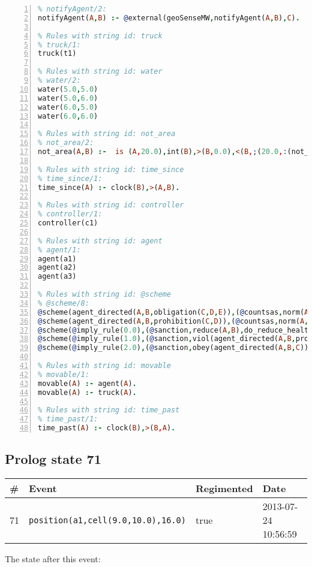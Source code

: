 \documentclass[11pt]{article}\usepackage[utf8]{inputenc}\usepackage{geometry}
\begin{document}
\begin{lstlisting}[language=Prolog, numbers=left]
% Rules with string id: notifyAgent
% notifyAgent/2:
notifyAgent(A,B) :- @external(geoSenseMW,notifyAgent(A,B),C).

% Rules with string id: truck
% truck/1:
truck(t1)

% Rules with string id: water
% water/2:
water(5.0,5.0)
water(5.0,6.0)
water(6.0,5.0)
water(6.0,6.0)

% Rules with string id: not_area
% not_area/2:
not_area(A,B) :-  is (A,20.0),int(B),>(B,0.0),<(B,;(20.0,:(not_area(A,B), is (-(B),20.0)))),int(A),>(A,0.0),<(A,;(20.0,:(area(A,B),-(int(A))))),int(B),>(A,0.0),>(B,0.0),<(A,21.0),<(B,21.0).

% Rules with string id: time_since
% time_since/1:
time_since(A) :- clock(B),>(A,B).

% Rules with string id: controller
% controller/1:
controller(c1)

% Rules with string id: agent
% agent/1:
agent(a1)
agent(a2)
agent(a3)

% Rules with string id: @scheme
% @scheme/8:
@scheme(agent_directed(A,B,obligation(C,D,E)),(@countsas,norm(A,B,F,obligation(C,D,E)),F),false,(listTrue(C)),(time_past(D)),false,[plus(viol(agent_directed(A,B,obligation(C,D,E))))|[]],[plus(obey(agent_directed(A,B,obligation(C,D,E))))|[]])
@scheme(agent_directed(A,B,prohibition(C,D)),(@countsas,norm(A,B,E,prohibition(C,D)),E),(listTrue(C)),false,(false),false,[plus(viol(agent_directed(A,B,prohibition(C,D))))|[]],[plus(obey(agent_directed(A,B,prohibition(C,D))))|[]])
@scheme(@imply_rule(0.0),(@sanction,reduce(A,B),do_reduce_health(A,B),notifyAgent(A,changed(status))),true,false,false,false,[min(reduce(A,B))|[]],[])
@scheme(@imply_rule(1.0),(@sanction,viol(agent_directed(A,B,prohibition(C,D))),do_sanction(D)),true,false,false,false,[min(viol(agent_directed(A,B,prohibition(C,D))))|[]],[])
@scheme(@imply_rule(2.0),(@sanction,obey(agent_directed(A,B,C))),true,false,false,false,[min(obey(agent_directed(A,B,C)))|[]],[])

% Rules with string id: movable
% movable/1:
movable(A) :- agent(A).
movable(A) :- truck(A).

% Rules with string id: time_past
% time_past/1:
time_past(A) :- clock(B),>(B,A).

\end{lstlisting}
\clearpage 
\subsection{Prolog state 71}
\begin{table}[ht]
\centering 
\begin{tabular}{l l l l} 
\textbf{\#} & \textbf{Event} & \textbf{Regimented} & \textbf{Date} \\ [0.5ex] 
\hline
71&\texttt{position(a1,cell(9.0,10.0),16.0)}&true&2013-07-24 10:56:59\\ [1ex] \hline\end{tabular}
\end{table}
The state after this event:
\end{document}
